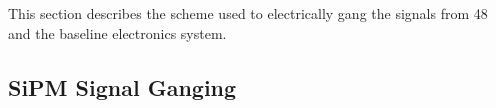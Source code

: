 This section describes the scheme used to electrically gang the signals from 48  and the baseline  electronics system.




\subsection{SiPM Signal Ganging}
\label{sec:pds-design-ganging}


